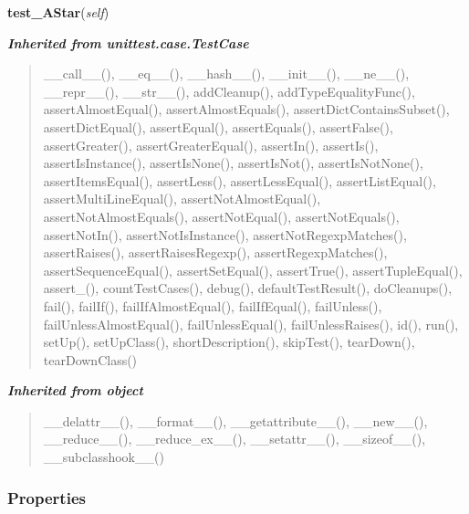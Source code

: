 \hspace{.8\funcindent}\begin{boxedminipage}{\funcwidth}

    \raggedright \textbf{test\_AStar}(\textit{self})

\setlength{\parskip}{2ex}
\setlength{\parskip}{1ex}
    \end{boxedminipage}


\large{\textbf{\textit{Inherited from unittest.case.TestCase}}}

\begin{quote}
\_\_call\_\_(), \_\_eq\_\_(), \_\_hash\_\_(), \_\_init\_\_(), \_\_ne\_\_(), \_\_repr\_\_(), \_\_str\_\_(), addCleanup(), addTypeEqualityFunc(), assertAlmostEqual(), assertAlmostEquals(), assertDictContainsSubset(), assertDictEqual(), assertEqual(), assertEquals(), assertFalse(), assertGreater(), assertGreaterEqual(), assertIn(), assertIs(), assertIsInstance(), assertIsNone(), assertIsNot(), assertIsNotNone(), assertItemsEqual(), assertLess(), assertLessEqual(), assertListEqual(), assertMultiLineEqual(), assertNotAlmostEqual(), assertNotAlmostEquals(), assertNotEqual(), assertNotEquals(), assertNotIn(), assertNotIsInstance(), assertNotRegexpMatches(), assertRaises(), assertRaisesRegexp(), assertRegexpMatches(), assertSequenceEqual(), assertSetEqual(), assertTrue(), assertTupleEqual(), assert\_(), countTestCases(), debug(), defaultTestResult(), doCleanups(), fail(), failIf(), failIfAlmostEqual(), failIfEqual(), failUnless(), failUnlessAlmostEqual(), failUnlessEqual(), failUnlessRaises(), id(), run(), setUp(), setUpClass(), shortDescription(), skipTest(), tearDown(), tearDownClass()
\end{quote}

\large{\textbf{\textit{Inherited from object}}}

\begin{quote}
\_\_delattr\_\_(), \_\_format\_\_(), \_\_getattribute\_\_(), \_\_new\_\_(), \_\_reduce\_\_(), \_\_reduce\_ex\_\_(), \_\_setattr\_\_(), \_\_sizeof\_\_(), \_\_subclasshook\_\_()
\end{quote}


  \subsubsection{Properties}

